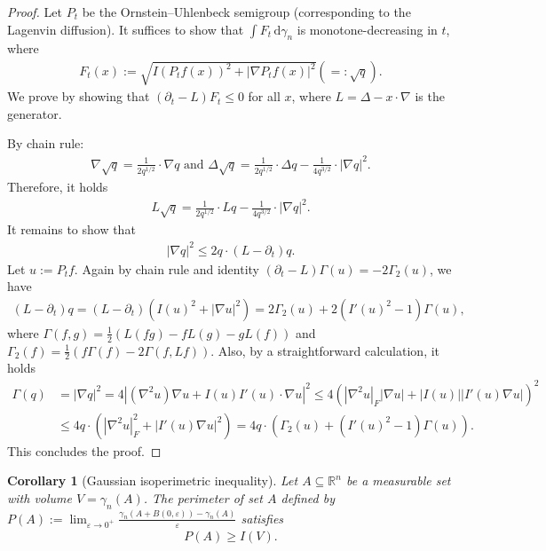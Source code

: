 \documentclass[11pt]{article}
\theoremstyle{plain}
\newtheorem{corollary}[theorem]{Corollary}
\theoremstyle{definition}
\theoremstyle{remark}
\newcommand{\dif}{\,\mathrm{d}}
\newcommand{\eps}{\varepsilon}
\newcommand{\tuple}[1]{\left(#1\right)}
\newcommand{\tp}{\tuple}
\newcommand{\abs}[1]{\left\vert#1\right\vert}
\begin{document}
\begin{proof}
    Let $P_t$ be the Ornstein–Uhlenbeck semigroup (corresponding to the Lagenvin diffusion).
    It suffices to show that $\int F_t \dif \gamma_n$ is monotone-decreasing in $t$, where 
    \begin{align*}
        F_t(x) := \sqrt{I(P_tf(x))^2 + \abs{\nabla P_tf(x)}^2} (=: \sqrt{q}). 
    \end{align*}
    We prove by showing that $(\partial_t - L) F_t \le 0$ for all $x$, where $L = \Delta - x \cdot \nabla$ is the generator.

    By chain rule:
    \begin{align*}
        \nabla \sqrt{q} = \frac{1}{2q^{1/2}} \cdot \nabla q \text{ and }  \Delta \sqrt{q} = \frac{1}{2q^{1/2}} \cdot \Delta q - \frac{1}{4q^{3/2}} \cdot \abs{\nabla q}^2.
    \end{align*}
    Therefore, it holds
    \begin{align*}
        L \sqrt{q} = \frac{1}{2q^{1/2}} \cdot Lq - \frac{1}{4q^{3/2}} \cdot \abs{\nabla q}^2.
    \end{align*}
    It remains to show that
    \begin{align*}
    \abs{\nabla q}^2 \le 2q \cdot (L - \partial_t)q. 
    \end{align*}
    Let $u := P_t f$. Again by chain rule and identity $(\partial_t - L)\Gamma(u) = -2\Gamma_2(u)$, we have
    \begin{align*}
        (L-\partial_t) q = (L-\partial_t) (I(u)^2 + \abs{\nabla u}^2) = 2 \Gamma_2(u) + 2 (I'(u)^2 - 1) \Gamma(u),
    \end{align*}
    where $\Gamma(f,g) = \frac{1}{2} \tp{L(fg) - fL(g)-gL(f)}$ and $\Gamma_2(f) = \frac{1}{2}\tp{f \Gamma(f) - 2\Gamma\tp{f,Lf}}$.
    Also, by a straightforward calculation, it holds
    \begin{align*}
        \Gamma(q) &= \abs{\nabla q}^2 = 4 \abs{(\nabla^2 u) \nabla u + I(u) I'(u) \cdot \nabla u }^2 \le 4 \tp{\abs{\nabla^2 u}_{F} \abs{\nabla u} + \abs{I(u)} \abs{I'(u) \nabla u}}^2\\
        &\le 4 q \cdot \tp{\abs{\nabla^2 u}^2_F + \abs{I'(u) \nabla u}^2} = 4q \cdot \tp{\Gamma_2(u) + (I'(u)^2 - 1)\Gamma(u)}.
    \end{align*}
    This concludes the proof.
\end{proof}

\begin{corollary}[Gaussian isoperimetric inequality]
    Let $A \subseteq \mathbb{R}^n$ be a measurable set with volume $V=\gamma_n(A)$. The perimeter of set $A$  defined by $P(A) := \lim_{\eps \to 0^+} \frac{\gamma_n(A+B(0,\eps)) - \gamma_n(A)}{\eps}$ satisfies
    \begin{align*}
        P(A) \ge I(V).
    \end{align*}
\end{corollary}
\end{document}
